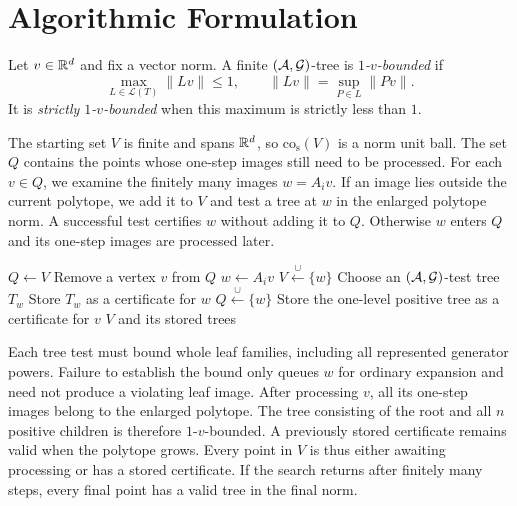 \section{Algorithmic Formulation}
\label{sec:hybridAlgorithm}

\begin{definition}
    \label{def:oneVBoundedTree}
    Let $v\in\mathbb{R}^d$ and fix a vector norm.
    A finite $(\mathcal{A},\mathcal{G})$-tree is \emph{$1$-$v$-bounded} if
    \[
        \max_{L\in\mathcal{L}(T)}\lVert Lv\rVert\leq1,
        \qquad \lVert Lv\rVert=\sup_{P\in L}\lVert Pv\rVert.
    \]
    It is \emph{strictly $1$-$v$-bounded} when this maximum is strictly less than $1$.
\end{definition}

The starting set $V$ is finite and spans $\mathbb{R}^d$, so $\mathrm{co}_{\mathrm{s}}(V)$ is a norm unit ball.
The set $Q$ contains the points whose one-step images still need to be processed.
For each $v\in Q$, we examine the finitely many images $w=A_iv$.
If an image lies outside the current polytope, we add it to $V$ and test a tree at $w$ in the enlarged polytope norm.
A successful test certifies $w$ without adding it to $Q$.
Otherwise $w$ enters $Q$ and its one-step images are processed later.

\begin{algorithm}[ht]
    \caption{Invariant-tree certificate search}
    \label{alg:hybridApproach}
    \begin{algorithmic}
        \State {}
        \State $Q\gets V$
            \State Remove a vertex $v$ from $Q$
                \State $w\gets A_iv$
                    \State $V\xleftarrow{\cup}\{w\}$
                    \State Choose an $(\mathcal{A},\mathcal{G})$-test tree $T_w$
                        \State Store $T_w$ as a certificate for $w$
                    \Else
                        \State $Q\xleftarrow{\cup}\{w\}$
                    \EndIf
                \EndIf
            \EndFor
            \State Store the one-level positive tree as a certificate for $v$
        \EndWhile
        \State \Return $V$ and its stored trees
    \end{algorithmic}
\end{algorithm}

Each tree test must bound whole leaf families, including all represented generator powers.
Failure to establish the bound only queues $w$ for ordinary expansion and need not produce a violating leaf image.
After processing $v$, all its one-step images belong to the enlarged polytope.
The tree consisting of the root and all $n$ positive children is therefore $1$-$v$-bounded.
A previously stored certificate remains valid when the polytope grows.
Every point in $V$ is thus either awaiting processing or has a stored certificate.
If the search returns after finitely many steps, every final point has a valid tree in the final norm.

